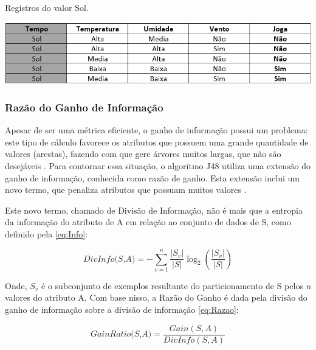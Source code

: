 \par
\begin{table}[!htp]
	\begin{center}
    \caption{\label{fig:waveform_fig} Registros do valor Sol.}
	\includegraphics[scale=0.70]{Figuras/Ramo_sol.png}
	\end{center}
\end{table}

\subsubsection{Razão do Ganho de Informação}

\par
Apesar de ser uma métrica eficiente, o ganho de informação possui um problema: este tipo de cálculo favorece os atributos que possuem uma grande quantidade de valores (arestas), fazendo com que gere árvores muitos largas, que não são desejáveis \cite{Garcia2003}. Para contornar essa situação, o algoritmo J48 utiliza uma extensão do ganho de informação, conhecida como razão de ganho. Esta extensão inclui um novo termo, que penaliza atributos que possuam muitos valores \cite{Carvalho2014}.

Este novo termo, chamado de Divisão de Informação, não é mais que a entropia da informação do atributo de A em relação ao conjunto de dados de S, como definido pela \autoref{eq:Info}:

\begin{equation}
    \label{eq:Info}
        {\textit{DivInfo(S,A)}={ - \sum_{v=1}^{n} \frac{|S_v|}{|S|} \log_{2}(\frac{|S_v|}{|S|}) } }
\end{equation}

\par
Onde, $S_v$ é o subconjunto de exemplos resultante do particionamento de S pelos \textit{n} valores do atributo A. Com base nisso, a Razão do Ganho é dada pela divisão do ganho de informação sobre a divisão de informação \autoref{eq:Razao}:

\begin{equation}
    \label{eq:Razao}
        {\textit{GainRatio(S,A)}={ \frac{Gain(S,A)}{DivInfo(S,A)} } }
\end{equation}


